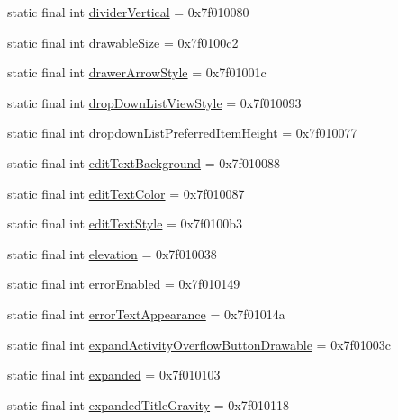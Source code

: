 \begin{CompactItemize}
\item 
static final int \hyperlink{classandroid_1_1support_1_1mediacompat_1_1_r_1_1attr_1feeb007fa2222f0f34b38680edb4cd0}{dividerVertical} = 0x7f010080
\item 
static final int \hyperlink{classandroid_1_1support_1_1mediacompat_1_1_r_1_1attr_d0994f184624446babb98919c421eb1b}{drawableSize} = 0x7f0100c2
\item 
static final int \hyperlink{classandroid_1_1support_1_1mediacompat_1_1_r_1_1attr_0527364a7137f5bc3eb90d39258ab05f}{drawerArrowStyle} = 0x7f01001c
\item 
static final int \hyperlink{classandroid_1_1support_1_1mediacompat_1_1_r_1_1attr_a5d7e23e021b5035ef02e158e8dd3950}{dropDownListViewStyle} = 0x7f010093
\item 
static final int \hyperlink{classandroid_1_1support_1_1mediacompat_1_1_r_1_1attr_6f22be7dafb268aa0674d4fde52386f7}{dropdownListPreferredItemHeight} = 0x7f010077
\item 
static final int \hyperlink{classandroid_1_1support_1_1mediacompat_1_1_r_1_1attr_345d2d49ca287838470129ebdba0cefb}{editTextBackground} = 0x7f010088
\item 
static final int \hyperlink{classandroid_1_1support_1_1mediacompat_1_1_r_1_1attr_b91fbcfa420b4f717d687ccf136ee707}{editTextColor} = 0x7f010087
\item 
static final int \hyperlink{classandroid_1_1support_1_1mediacompat_1_1_r_1_1attr_e32970ae0a194ab50c533b772893b59f}{editTextStyle} = 0x7f0100b3
\item 
static final int \hyperlink{classandroid_1_1support_1_1mediacompat_1_1_r_1_1attr_873649a1ed4fceb7d6a140f40280b4de}{elevation} = 0x7f010038
\item 
static final int \hyperlink{classandroid_1_1support_1_1mediacompat_1_1_r_1_1attr_44b10f398ae724be760165dfba834ee9}{errorEnabled} = 0x7f010149
\item 
static final int \hyperlink{classandroid_1_1support_1_1mediacompat_1_1_r_1_1attr_4e2612eb23d9f3c949b844ffcc087037}{errorTextAppearance} = 0x7f01014a
\item 
static final int \hyperlink{classandroid_1_1support_1_1mediacompat_1_1_r_1_1attr_ceb69f897ae34e0d9e9cb70b4a41a1f6}{expandActivityOverflowButtonDrawable} = 0x7f01003c
\item 
static final int \hyperlink{classandroid_1_1support_1_1mediacompat_1_1_r_1_1attr_9a456e1910b1d606220d08f336675480}{expanded} = 0x7f010103
\item 
static final int \hyperlink{classandroid_1_1support_1_1mediacompat_1_1_r_1_1attr_43c1912cf066247718c446afb25c6f6b}{expandedTitleGravity} = 0x7f010118

\end{CompactItemize}
